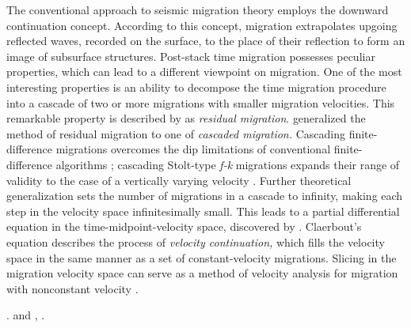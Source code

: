 The conventional approach to seismic migration theory
\cite[]{Claerbout.blackwell.85,Berkhout.mig.14A.1985} employs the
downward continuation concept. According to this concept, migration
extrapolates upgoing reflected waves, recorded on the surface, to the
place of their reflection to form an image of subsurface
structures.
Post-stack time migration possesses peculiar properties, which can
lead to a different viewpoint on migration.  One of the most
interesting properties is an ability to decompose the time migration
procedure into a cascade of two or more migrations with smaller
migration velocities. This remarkable property is described by
\cite{GEO50.01.01100126} as {\em residual migration}.
\cite{GEO52.05.06180643} generalized the method of residual
migration to one of {\em cascaded migration.} Cascading
finite-difference migrations overcomes the dip limitations of
conventional finite-difference algorithms \cite[]{GEO52.05.06180643};
cascading Stolt-type {\em f-k} migrations expands their range of
validity to the case of a vertically varying velocity
\cite[]{GEO53.07.08810893}. Further theoretical generalization sets
the number of migrations in a cascade to infinity, making each step in
the velocity space infinitesimally small. This leads to a partial
differential equation in the time-midpoint-velocity space, discovered
by \cite{Claerbout.sep.48.79}. Claerbout's equation describes the
process of {\em velocity continuation,} which fills the velocity space
in the same manner as a set of constant-velocity migrations. Slicing
in the migration velocity space can serve as a method of velocity
analysis for migration with nonconstant velocity
\cite[]{shurtleff,SEG-1984-S1.8,Fowler.sepphd.58, GEO57-01-00510059}.

 \cite[]{me,Fomel.segab.97}.  \cite{hubral} and
\cite{GEO62-02-05890597}  \cite{adler} 
\cite[]{FBR08.06.02240234,GEO60-01-01420153}, 
 \cite[]{SEG-2001-11071110,second}. 

